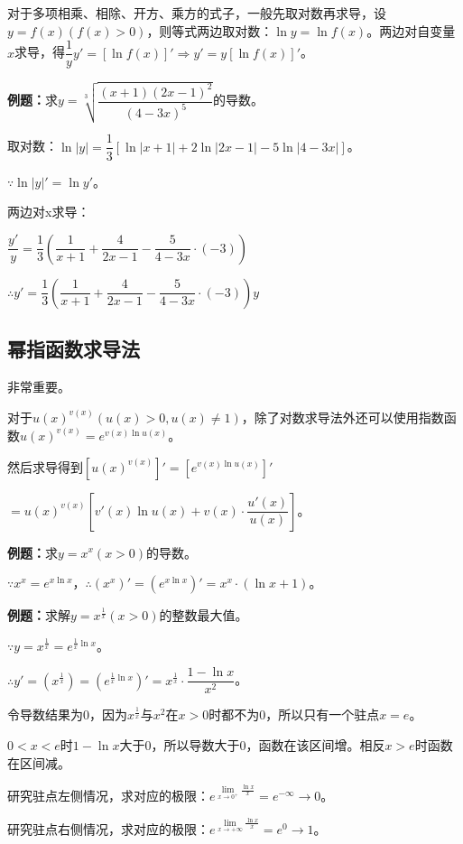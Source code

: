\documentclass[UTF8, 12pt]{ctexart}
\begin{document}
对于多项相乘、相除、开方、乘方的式子，一般先取对数再求导，设$y=f(x)(f(x)>0)$，则等式两边取对数：$\ln y=\ln f(x)$。两边对自变量$x$求导，得$\dfrac{1}{y}y'=[\ln f(x)]'\Rightarrow y'=y[\ln f(x)]'$。

\textbf{例题：}求$y=\sqrt[3]{\dfrac{(x+1)(2x-1)^2}{(4-3x)^5}}$的导数。

取对数：$\ln\vert y\vert=\dfrac{1}{3}[\ln\vert x+1\vert+2\ln\vert 2x-1\vert-5\ln\vert 4-3x\vert]$。

$\because \ln\vert y\vert'=\ln y'$。

两边对x求导：\medskip

$\dfrac{y'}{y}=\dfrac{1}{3}\left(\dfrac{1}{x+1}+\dfrac{4}{2x-1}-\dfrac{5}{4-3x}\cdot(-3)\right)$

$\therefore y'=\dfrac{1}{3}\left(\dfrac{1}{x+1}+\dfrac{4}{2x-1}-\dfrac{5}{4-3x}\cdot(-3)\right)y$

\subsection{幂指函数求导法}

非常重要。

对于$u(x)^{v(x)}(u(x)>0,u(x)\neq 1)$，除了对数求导法外还可以使用指数函数$u(x)^{v(x)}=e^{v(x)\ln u(x)}$。

然后求导得到$[u(x)^{v(x)}]'=[e^{v(x)\ln u(x)}]'$

$=u(x)^{v(x)}\left[v'(x)\ln u(x)+v(x)\cdot\dfrac{u'(x)}{u(x)}\right]$。

\textbf{例题：}求$y=x^x(x>0)$的导数。

$\because x^x=e^{x\ln x}$，$\therefore (x^x)'=(e^{x\ln x})'=x^x\cdot(\ln x+1)$。

\textbf{例题：}求解$y=x^{\frac{1}{x}}(x>0)$的整数最大值。

$\because y=x^{\frac{1}{x}}=e^{\frac{1}{x}\ln x}$。

$\therefore y'=\left(x^{\frac{1}{x}}\right)=\left(e^{\frac{1}{x}\ln x}\right)'=x^{\frac{1}{x}}\cdot\dfrac{1-\ln x}{x^2}$。

令导数结果为0，因为$x^{\frac{1}{x}}$与$x^2$在$x>0$时都不为0，所以只有一个驻点$x=e$。

$0<x<e$时$1-\ln x$大于0，所以导数大于0，函数在该区间增。相反$x>e$时函数在区间减。

研究驻点左侧情况，求对应的极限：$e^{\lim\limits_{x\to 0^+}\frac{\ln x}{x}}=e^{-\infty}\to 0$。

研究驻点右侧情况，求对应的极限：$e^{\lim\limits_{x\to+\infty}\frac{\ln x}{x}}=e^0\to 1$。
\end{document}
